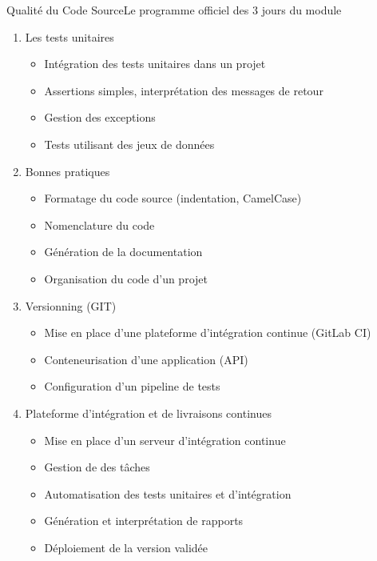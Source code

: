 \documentclass{beamer}
\begin{document}
    \begin{frame}{Qualité du Code Source}{Le programme officiel des 3 jours du module}
        \transdissolve
        \fontsize{8pt}{8pt}\selectfont
        \begin{enumerate}
            \item Les tests unitaires
            \begin{itemize}
                \fontsize{8pt}{8pt}\selectfont
                \item Intégration des tests unitaires dans un projet
                \item Assertions simples, interprétation des messages de retour
                \item Gestion des exceptions
                \item Tests utilisant des jeux de données
            \end{itemize}
            \item Bonnes pratiques
            \begin{itemize}
                \fontsize{8pt}{8pt}\selectfont
                \item Formatage du code source (indentation, CamelCase)
                \item Nomenclature du code
                \item Génération de la documentation
                \item Organisation du code d’un projet
            \end{itemize}
            \item Versionning (GIT)
            \begin{itemize}
                \fontsize{8pt}{8pt}\selectfont
                \item Mise en place d'une plateforme d'intégration continue (GitLab CI)
                \item Conteneurisation d'une application (API)
                \item Configuration d'un pipeline de tests
            \end{itemize}
            \item Plateforme d’intégration et de livraisons continues
            \begin{itemize}
                \fontsize{8pt}{8pt}\selectfont
                \item Mise en place d’un serveur d’intégration continue
                \item Gestion de des tâches
                \item Automatisation des tests unitaires et d’intégration
                \item Génération et interprétation de rapports
                \item Déploiement de la version validée
            \end{itemize}
        \end{enumerate}
    \end{frame}
\end{document}
